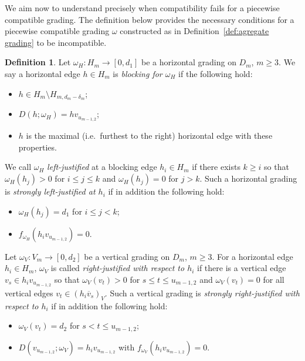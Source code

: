\documentclass[10pt]{amsart}
\theoremstyle{definition}
\newtheorem{definition}[theorem]{Definition}
\newcommand{\ie}{i.e.\ }
\begin{document}
We aim now to understand precisely when compatibility fails for a piecewise compatible grading. 
The definition below provides the necessary conditions for a piecewise compatible grading $\omega$ constructed as in Definition~\ref{def:agregate grading} to be incompatible.
\begin{definition}
 \label{def:blocking and justification}
 Let $\omega_H:H_m\to[0,d_1]$ be a horizontal grading on $D_m$, $m\ge3$. We say a horizontal edge $h\in H_m$ is \emph{blocking for $\omega_H$} if the following hold:
 \begin{itemize}
 \item $h\in H_m\setminus H_{m,d_m-\delta_m}$;
 \item $D(h;\omega_H)=hv_{u_{m-1,2}}$;
 \item $h$ is the maximal (\ie furthest to the right) horizontal edge with these properties.
 \end{itemize}
 We call $\omega_H$ \emph{left-justified} at a blocking edge $h_i\in H_m$ if there exists $k\ge i$ so that $\omega_H(h_j)>0$ for $i\le j\le k$ and $\omega_H(h_j)=0$ for $j>k$. 
 Such a horizontal grading is \emph{strongly left-justified at $h_i$} if in addition the following hold:
 \begin{itemize}
 \item $\omega_H(h_j)=d_1$ for $i\le j<k$;
 \item $f_{\omega_H}(h_iv_{u_{m-1,2}})=0$.
 \end{itemize}
 Let $\omega_V:V_m\to[0,d_2]$ be a vertical grading on $D_m$, $m\ge3$. 
 For a horizontal edge $h_i\in H_m$, $\omega_V$ is called \emph{right-justified with respect to $h_i$} if there is a vertical edge $v_s\in h_iv_{u_{m-1,2}}$ so that $\omega_V(v_t)>0$ for $s\le t\le u_{m-1,2}$ and $\omega_V(v_t)=0$ for all vertical edges $v_t\in(h_i\overline{v}_s)_V$. 
 Such a vertical grading is \emph{strongly right-justified with respect to $h_i$} if in addition the following hold:
 \begin{itemize}
 \item $\omega_V(v_t)=d_2$ for $s<t\le u_{m-1,2}$;
 \item $D(v_{u_{m-1,2}};\omega_V)=h_iv_{u_{m-1,2}}$ with $f_{\omega_V}(h_iv_{u_{m-1,2}})=0$.
 \end{itemize}
\end{definition}
\end{document}
